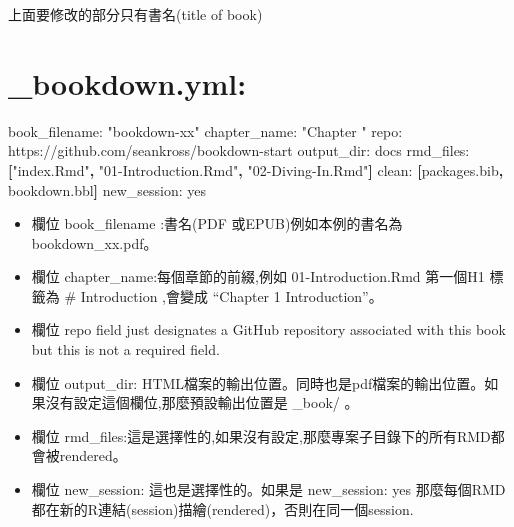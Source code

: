 \documentclass[]{book}
\newenvironment{Shaded}{\begin{snugshade}}{\end{snugshade}}
\newcommand{\AttributeTok}[1]{\textcolor[rgb]{0.77,0.63,0.00}{#1}}
\newcommand{\FunctionTok}[1]{\textcolor[rgb]{0.00,0.00,0.00}{#1}}
\newcommand{\KeywordTok}[1]{\textcolor[rgb]{0.13,0.29,0.53}{\textbf{#1}}}
\newcommand{\NormalTok}[1]{#1}
\newcommand{\StringTok}[1]{\textcolor[rgb]{0.31,0.60,0.02}{#1}}
\providecommand{\tightlist}{%
  \setlength{\itemsep}{0pt}\setlength{\parskip}{0pt}}
\theoremstyle{definition}
\theoremstyle{definition}
\theoremstyle{definition}
\theoremstyle{remark}
\begin{document}
上面要修改的部分只有書名(title of book)

\hypertarget{bookdown.yml}{%
\section{\_bookdown.yml:}\label{bookdown.yml}}

\begin{Shaded}
\begin{Highlighting}[]

\FunctionTok{book_filename:}\AttributeTok{ }\StringTok{"bookdown-xx"}
\FunctionTok{chapter_name:}\AttributeTok{ }\StringTok{"Chapter "}
\FunctionTok{repo:}\AttributeTok{ https://github.com/seankross/bookdown-start}
\FunctionTok{output_dir:}\AttributeTok{ docs}
\FunctionTok{rmd_files:}\AttributeTok{ }\KeywordTok{[}\StringTok{"index.Rmd"}\KeywordTok{,} \StringTok{"01-Introduction.Rmd"}\KeywordTok{,} \StringTok{"02-Diving-In.Rmd"}\KeywordTok{]}
\FunctionTok{clean:}\AttributeTok{ }\KeywordTok{[}\NormalTok{packages.bib}\KeywordTok{,}\NormalTok{ bookdown.bbl}\KeywordTok{]}
\FunctionTok{new_session:}\AttributeTok{ yes}
\end{Highlighting}
\end{Shaded}

\begin{itemize}
\tightlist
\item
  欄位 book\_filename :書名(PDF
  或EPUB)例如本例的書名為bookdown\_xx.pdf。\\
\item
  欄位 chapter\_name:每個章節的前綴,例如 01-Introduction.Rmd 第一個H1
  標籤為 \# Introduction ,會變成 ``Chapter 1 Introduction''。\\
\item
  欄位 repo field just designates a GitHub repository associated with
  this book but this is not a required field.\\
\item
  欄位 output\_dir:
  HTML檔案的輸出位置。同時也是pdf檔案的輸出位置。如果沒有設定這個欄位,那麼預設輸出位置是
  \_book/ 。\\
\item
  欄位
  rmd\_files:這是選擇性的,如果沒有設定,那麼專案子目錄下的所有RMD都會被rendered。\\
\item
  欄位 new\_session: 這也是選擇性的。如果是 new\_session: yes
  那麼每個RMD都在新的R連結(session)描繪(rendered)，否則在同一個session.
\end{itemize}
\end{document}

